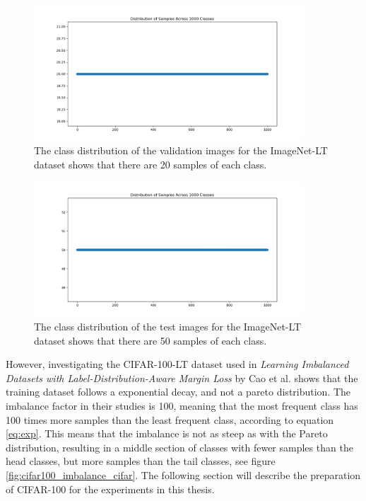 \begin{figure}[h!]
    \centering
    \includegraphics[width=0.9\textwidth]{Images/Plots/class_distribution_val.png}
    \caption{The class distribution of the validation images for the ImageNet-LT dataset shows that there are 20 samples of each class.}
    \label{fig:IN-val}
\end{figure}

\begin{figure}[h!]
    \centering
    \includegraphics[width=0.9\textwidth]{Images/Plots/class_distribution_test.png}
    \caption{The class distribution of the test images for the ImageNet-LT dataset shows that there are 50 samples of each class.}
    \label{fig:IN-test}
\end{figure}


However, investigating the CIFAR-100-LT dataset used in \emph{Learning Imbalanced Datasets with Label-Distribution-Aware Margin Loss} by Cao et al. \cite{cao2019learningimbalanceddatasetslabeldistributionaware} shows that the training dataset follows a exponential decay, and not a pareto distribution. The imbalance factor in their studies is 100, meaning that the most frequent class has 100 times more samples than the least frequent class, according to equation \eqref{eq:exp}. This means that the imbalance is not as steep as with the Pareto distribution, resulting in a middle section of classes with fewer samples than the head classes, but more samples than the tail classes, see figure \ref{fig:cifar100_imbalance_cifar}. The following section will describe the preparation of CIFAR-100 for the experiments in this thesis.


